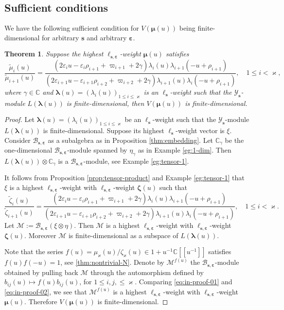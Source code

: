 \documentclass[11pt,reqno]{amsart}
\numberwithin{equation}{section}
\newtheorem{thm}{Theorem}[section]
\theoremstyle{definition}
\theoremstyle{remark}
\newcommand{\beq}{\begin{equation}}
\newcommand{\eeq}{\end{equation}}
\newcommand{\C}{\mathbb{C}}
\newcommand{\mc}{\mathcal}
\newcommand{\bC}{\mathbb{C}}
\newcommand{\tl}{\tilde}
\newcommand{\lle}{\leqslant}
\newcommand{\la}{\lambda}
\newcommand{\bla}{\bm\lambda}
\newcommand{\YMN}{{\mathscr{Y}_{\bm s}}}
\newcommand{\BMN}{{\mathscr{B}_{\bm s,\bm \ve}}}
\newcommand{\ka}{\varkappa}
\newcommand{\ve}{\varepsilon}
\newcommand{\s}{{\bm s}}
\begin{document}
\subsection{Sufficient conditions}
We have the following sufficient condition for $V(\bm\mu(u))$ being finite-dimensional for arbitrary $\s$ and arbitrary $\bm\ve$.
\begin{thm}\label{thm:suff}
Suppose the highest $\ell_{\s,\bm\ve}$-weight $\bm\mu(u)$ satisfies
\beq\label{eq:in-proof-01}
\frac{\tl \mu_i(u)}{\tl \mu_{i+1}(u)}=\frac{(2\ve_{i}u-\ve_{i}\rho_{i+1}+\varpi_{i+1}+2\gamma)\la_i(u) \la_{i+1}(-u+\rho_{i+1})}{(2\ve_{i+1}u-\ve_{i+1}\rho_{i+2}+\varpi_{i+2}+2\gamma)\la_{i+1}(u)\la_i(-u+\rho_{i+1})},\quad 1\lle i<\ka,
\eeq
where $\gamma\in\bC$ and $\bm\la(u)=(\la_i(u))_{1\lle i\lle \ka}$ is an  $\ell_\s$-weight such that the $\YMN$-module $L(\bla(u))$ is finite-dimensional, then $V(\bm\mu(u))$ is finite-dimensional.
\end{thm}
\begin{proof}
Let $\bm\la(u)=(\la_i(u))_{1\lle i\lle \ka}$ be an  $\ell_\s$-weight such that the $\YMN$-module $L(\bla(u))$ is finite-dimensional. Suppose its highest $\ell_\s$-weight vector is $\xi$. Consider $\BMN$ as a subalgebra as in Proposition \ref{thm:embedding}. Let $\bC_{\gamma}$ be the one-dimensional $\BMN$-module spanned by $\eta_\gamma$ as in Example \ref{eg:1-dim}. Then $L(\bla(u))\otimes \bC_\gamma$ is a $\BMN$-module, see Example \ref{eg:tensor-1}.

It follows from Proposition \ref{prop:tensor-product} and Example \ref{eg:tensor-1} that $\xi$ is a highest $\ell_{\s,\bm\ve}$-weight with $\ell_{\s,\bm\ve}$-weight $\bm\zeta(u)$ such that
\beq\label{eq:in-proof-02}
\frac{\tl \zeta_i(u)}{\tl \zeta_{i+1}(u)}=\frac{(2\ve_{i}u-\ve_{i}\rho_{i+1}+\varpi_{i+1}+2\gamma)\la_i(u) \la_{i+1}(-u+\rho_{i+1})}{(2\ve_{i+1}u-\ve_{i+1}\rho_{i+2}+\varpi_{i+2}+2\gamma)\la_{i+1}(u)\la_i(-u+\rho_{i+1})},\quad 1\lle i<\ka.
\eeq
Let $\mathcal M:=\BMN (\xi\otimes\eta)$. Then $\mathcal M$ is a  highest $\ell_{\s,\bm\ve}$-weight with $\ell_{\s,\bm\ve}$-weight $\bm\zeta(u)$. Moreover $\mc M$ is finite-dimensional as a subspace of $L(\bla(u))$.

Note that the series $f(u)=\mu_{\ka}(u)/\zeta_{\ka}(u)\in 1+u^{-1}\C[[u^{-1}]]$ satisfies $f(u)f(-u)=1$, see \eqref{thm:nontrivial-N}. Denote by $\mc M^{f(u)}$ the $\BMN$-module obtained by pulling back $\mc M$ through the automorphism defined by $b_{ij}(u)\mapsto f(u)b_{ij}(u)$, for $1\lle i,j,\lle \ka$. Comparing \eqref{eq:in-proof-01} and \eqref{eq:in-proof-02}, we see that $\mathcal M^{f(u)}$ is a  highest $\ell_{\s,\bm\ve}$-weight with $\ell_{\s,\bm\ve}$-weight $\bm\mu(u)$. Therefore $V(\bm\mu(u))$ is finite-dimensional.
 \end{proof}
\end{document}
